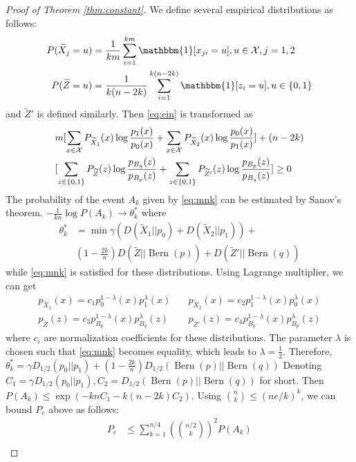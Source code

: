 \documentclass[conference]{IEEEtran}
\DeclareMathOperator{\Bern}{Bern}
\begin{document}
\begin{proof}[Proof of Theorem \ref{thm:constant}]
We define several empirical distributions as follows: 
\begin{align*}
P(\widetilde{X}_j = u) &= \frac{1}{km} \sum_{i=1}^{km} \mathbbm{1}[x_{ji} = u], u \in \mathcal{X}, j=1,2 \\
P(\widetilde{Z} = u) &= \frac{1}{k(n-2k)}\sum_{i=1}^{k(n-2k)} \mathbbm{1}[z_i = u], u \in \{0, 1\}
\end{align*}
and $\widetilde{Z}'$ is defined similarly. Then
\eqref{eq:ein} is transformed as
\begin{align}
&m[\sum_{x\in \mathcal{X}}P_{\widetilde{X}_1}(x)\log\frac{p_1(x)}{p_0(x)}
+\sum_{x\in \mathcal{X}}P_{\widetilde{X}_2}(x)\log\frac{p_0(x)}{p_1(x)}] +(n-2k)\notag \\
&[\sum_{z\in\{0,1\}} P_{\widetilde{Z}}(z) \log \frac{p_{B_q}(z)}{p_{B_p}(z)}
+ \sum_{z\in\{0,1\}} P_{\widetilde{Z}'}(z) \log \frac{p_{B_p}(z)}{p_{B_q}(z)}] \geq 0 \label{eq:mnk}
\end{align}
The probability of the event $A_k$ given by \eqref{eq:mnk} can be estimated by Sanov's theorem.
$-\frac{1}{kn}\log P(A_k) \to \theta^*_k$ where 
\begin{align*}
\theta^*_k &= \min \gamma (D(\widetilde{X}_1||p_0) + D(\widetilde{X}_2||p_1)) + \\
&(1-\frac{2k}{n})D(\widetilde{Z}||\Bern(p)) + D(\widetilde{Z}'||\Bern(q)) 
\end{align*}
while \eqref{eq:mnk} is satisfied for these distributions. Using Lagrange multiplier, we can get
\begin{align*}
p_{\widetilde{X}_1}(x) = c_1 p_0^{1-\lambda}(x)p_1^{\lambda}(x)\quad & p_{\widetilde{X}_2}(x) = c_2 p_1^{1-\lambda}(x)p_0^{\lambda}(x) \\
p_{\widetilde{Z}}(z) = c_3 p_{B_p}^{1-\lambda}(x)p_{B_q}^{\lambda}(z)\quad &
p_{\widetilde{Z}'}(z) = c_4 p_{B_q}^{1-\lambda}(x)p_{B_p}^{\lambda}(z)
\end{align*}
where $c_i$ are normalization coefficients for these distributions.
The parameter $\lambda$ is chosen such that \eqref{eq:mnk} becomes equality, which leads to $\lambda=\frac{1}{2}$.
Therefore, $\theta^*_k = \gamma D_{1/2}(p_0 || p_1) +(1-\frac{2k}{n}) D_{1/2}(\Bern(p)||\Bern(q))$
Denoting $C_1=\gamma D_{1/2}(p_0 || p_1), C_2=D_{1/2}(\Bern(p)||\Bern(q))$ for short.
Then $
P(A_k) \leq \exp(-knC_1-k(n-2k) C_2)
$. Using $\binom{n}{k} \leq (ne/k)^k$, we can bound $P_e$ above as follows:
\begin{align*}
P_e & \leq \sum_{k=1}^{n/4} (\binom{n/2}{k})^2 P(A_k) \\

\end{align*}
\end{proof}
\end{document}
